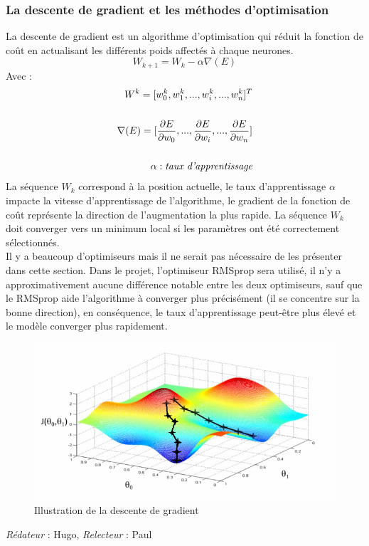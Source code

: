 \documentclass[oneside,a4paper,13pt]{article}
\begin{document}
\subsubsection{La descente de gradient et les méthodes d'optimisation}
La descente de gradient est un algorithme d'optimisation qui réduit la fonction de coût en actualisant les différents poids affectés à chaque neurones.
\begin{equation}
    {W_{k+1}} = W_{k} - \alpha\nabla(E)
\end{equation}
Avec :
\begin{align*}
W^{k} = [w_{0}^{k},w_{1}^{k},...,w_{i}^{k},...,w_{n}^{k}]^{T}\\ \\
\nabla(E) = [\frac{\partial E}{\partial w_{0}},...,\frac{\partial E}{\partial w_{i}},...,\frac{\partial E}{\partial w_{n}}]\\ \\
\alpha : \emph{taux d'apprentissage}\\
\end{align*}
La séquence $W_{k}$ correspond à la position actuelle, le taux d'apprentissage $\alpha$ impacte la vitesse d'apprentissage de l'algorithme, le gradient de la fonction de coût représente la direction de l'augmentation la plus rapide.
La séquence $W_{k}$ doit converger vers un minimum local si les paramètres ont été correctement sélectionnés.\\
Il y a beaucoup d'optimiseurs mais il ne serait pas nécessaire de les présenter dans cette section.
Dans le projet, l'optimiseur RMSprop sera utilisé, il n'y a approximativement aucune différence notable entre les deux optimiseurs, sauf que le RMSprop aide l'algorithme à converger plus précisément (il se concentre sur la bonne direction), en conséquence, le taux d'apprentissage peut-être plus élevé et le modèle converger plus rapidement.
\begin{figure}[H]
    \centering
    \includegraphics[scale=0.5]{Images/gradient_descent.png}
    \caption{Illustration de la descente de gradient}
    \label{fig:gradient_descent}
\end{figure}
\smallbreak\textit{Rédateur} : Hugo, \textit{Relecteur} : Paul
\end{document}

